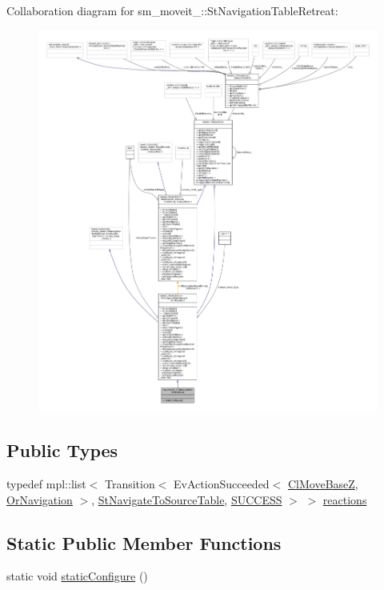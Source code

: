 Collaboration diagram for sm\+\_\+moveit\+\_\+:\+:St\+Navigation\+Table\+Retreat\+:
\nopagebreak
\begin{figure}[H]
\begin{center}
\leavevmode
\includegraphics[width=350pt]{structsm__moveit__4_1_1StNavigationTableRetreat__coll__graph}
\end{center}
\end{figure}
\subsection*{Public Types}
\begin{DoxyCompactItemize}
\item 
typedef mpl\+::list$<$ Transition$<$ Ev\+Action\+Succeeded$<$ \hyperlink{classcl__move__base__z_1_1ClMoveBaseZ}{Cl\+Move\+BaseZ}, \hyperlink{classsm__moveit__4_1_1OrNavigation}{Or\+Navigation} $>$, \hyperlink{structsm__moveit__4_1_1StNavigateToSourceTable}{St\+Navigate\+To\+Source\+Table}, \hyperlink{classSUCCESS}{S\+U\+C\+C\+E\+SS} $>$ $>$ \hyperlink{structsm__moveit__4_1_1StNavigationTableRetreat_abc8d03746076d2cf10d7c9b8cd31537c}{reactions}
\end{DoxyCompactItemize}
\subsection*{Static Public Member Functions}
\begin{DoxyCompactItemize}
\item 
static void \hyperlink{structsm__moveit__4_1_1StNavigationTableRetreat_a499aca1e3a8cf140072466558bf99cf8}{static\+Configure} ()
\end{DoxyCompactItemize}
